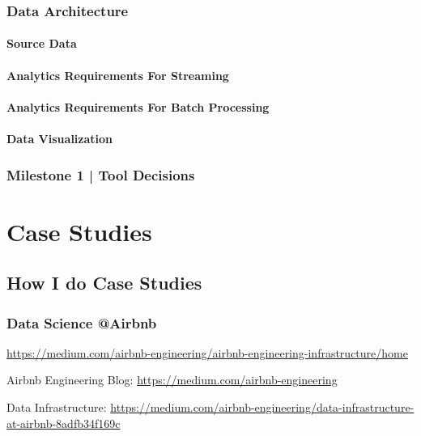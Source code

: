 \documentclass[12pt, numbers=noenddot]{scrreprt} %
\begin{document}
\section{Data Architecture}

\subsection{Source Data}

\subsection{Analytics Requirements For Streaming}

\subsection{Analytics Requirements For Batch Processing}

\subsection{Data Visualization}

\section{Milestone 1 | Tool Decisions}










\part{Case Studies}

\chapter{How I do Case Studies}

\section{Data Science @Airbnb}
\url{https://medium.com/airbnb-engineering/airbnb-engineering-infrastructure/home}

Airbnb Engineering Blog:
\url{https://medium.com/airbnb-engineering}

Data Infrastructure:
\url{https://medium.com/airbnb-engineering/data-infrastructure-at-airbnb-8adfb34f169c}
\end{document}
